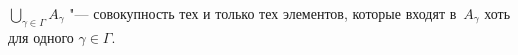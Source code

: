 
$\bigcup\limits_{\gamma\in \Gamma} A_{\gamma}$ "--- совокупность тех и только тех элементов,
 которые входят в~$A_\gamma$ хоть для одного $\gamma\in\Gamma$.
